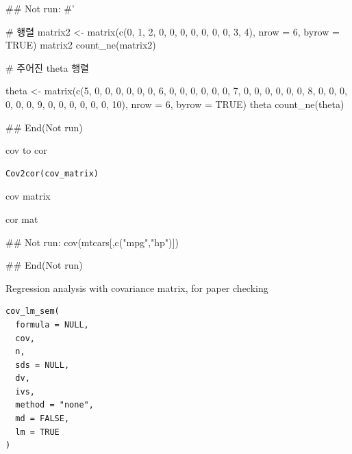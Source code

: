 \documentclass[a4paper]{book}
\begin{document}
\begin{Examples}
\begin{ExampleCode}

\#\# Not run: 
#'

#  행렬
matrix2 <- matrix(c(0, 1, 2, 0, 0, 0,
                    0, 0, 0, 0, 3, 4), nrow = 6, byrow = TRUE)
matrix2
count_ne(matrix2)

# 주어진 theta 행렬

theta <- matrix(c(5, 0, 0, 0, 0, 0,
                  0, 6, 0, 0, 0, 0,
                  0, 0, 7, 0, 0, 0,
                  0, 0, 0, 8, 0, 0,
                  0, 0, 0, 0, 9, 0,
                  0, 0, 0, 0, 0, 10), nrow = 6, byrow = TRUE)
theta
count_ne(theta)

## End(Not run)

\end{ExampleCode}
\end{Examples}
%
\begin{Description}
cov to cor
\end{Description}
%
\begin{Usage}
\begin{verbatim}
Cov2cor(cov_matrix)
\end{verbatim}
\end{Usage}
%
\begin{Arguments}
\begin{ldescription}
\item[\code{cov\_matrix}] cov matrix
\end{ldescription}
\end{Arguments}
%
\begin{Value}
cor mat
\end{Value}
%
\begin{Examples}
\begin{ExampleCode}

\#\# Not run: 
cov(mtcars[,c("mpg","hp")])%

## End(Not run)
\end{ExampleCode}
\end{Examples}
%
\begin{Description}
Regression analysis with covariance matrix, for paper checking
\end{Description}
%
\begin{Usage}
\begin{verbatim}
cov_lm_sem(
  formula = NULL,
  cov,
  n,
  sds = NULL,
  dv,
  ivs,
  method = "none",
  md = FALSE,
  lm = TRUE
)
\end{verbatim}
\end{Usage}
\end{document}
